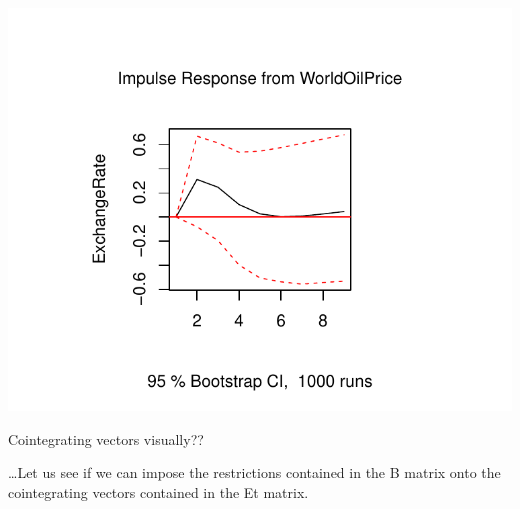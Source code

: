 \documentclass[11pt,preprint, authoryear]{elsarticle}
\numberwithin{equation}{section}
\numberwithin{figure}{section}
\numberwithin{table}{section}
\begin{document}
\begin{center}\includegraphics{README_files/figure-latex/unnamed-chunk-13-5} \end{center}

Cointegrating vectors visually??

\ldots Let us see if we can impose the restrictions contained in the B
matrix onto the cointegrating vectors contained in the Et matrix.
\end{document}
